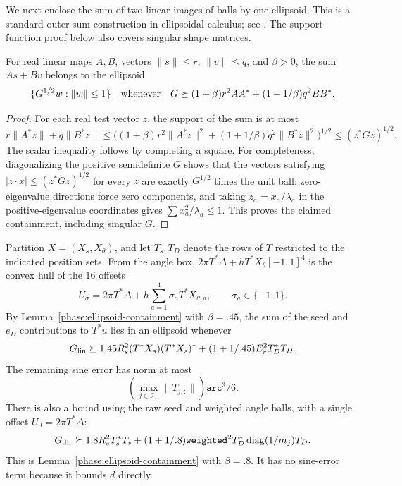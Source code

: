 We next enclose the sum of two linear images of balls by one ellipsoid.
This is a standard outer-sum construction in ellipsoidal calculus; see
\cite[Section~2.2.2, equation~(2.16)]{KurzhanskiyVaraiya2006EllipsoidalToolbox}.
The support-function proof below also covers singular shape matrices.

\begin{lemma}
\label{phase:ellipsoid-containment}
For real linear maps \(A,B\), vectors \(\|s\|\leq r\),
\(\|v\|\leq q\), and \(\beta>0\), the sum \(As+Bv\) belongs to
the ellipsoid
\[
 \{G^{1/2}w:\|w\|\leq1\}
 \quad\hbox{whenever}\quad
 G\succeq(1+\beta)r^2AA^*+(1+1/\beta)q^2BB^*.
\]
\end{lemma}

\begin{proof}
For each real test vector \(z\), the support of the sum is at most
\[
 r\|A^*z\|+q\|B^*z\|
 \leq\bigl((1+\beta)r^2\|A^*z\|^2+
                 (1+1/\beta)q^2\|B^*z\|^2\bigr)^{1/2}
 \leq(z^*Gz)^{1/2}.
\]
The scalar inequality follows by completing a square.
For completeness, diagonalizing the positive semidefinite \(G\)
shows that the vectors satisfying
\(|z\cdot x|\leq(z^*Gz)^{1/2}\) for every \(z\) are exactly
\(G^{1/2}\) times the unit ball: zero-eigenvalue directions force
zero components, and taking
\(z_a=x_a/\lambda_a\) in the positive-eigenvalue coordinates gives
\(\sum x_a^2/\lambda_a\leq1\).
This proves the claimed containment, including singular \(G\).
\end{proof}

Partition \(X=(X_s,X_\theta)\), and let \(T_s,T_D\) denote the rows
of \(T\) restricted to the indicated position sets.  From the angle
box, \(2\pi T^*\Delta+hT^*X_\theta[-1,1]^4\) is the convex hull of
the \(16\) offsets
\begin{equation}
 U_\sigma=2\pi T^*\Delta+
                h\sum_{a=1}^{4}\sigma_a T^*X_{\theta,a},
 \qquad \sigma_a\in\{-1,1\}.
 \label{phase:offset-corners}
\end{equation}
By Lemma~\ref{phase:ellipsoid-containment} with \(\beta=.45\), the
sum of the seed and \(e_D\) contributions to \(T^*u\) lies in an
ellipsoid whenever
\begin{equation}
 G_{\rm lin}\succeq
    1.45R_s^2(T^*X_s)(T^*X_s)^*
       +(1+1/.45)E_r^2T_D^*T_D.
 \label{phase:ellipsoid-linear}
\end{equation}
The remaining sine error has norm at most
\[
 \left(\max_{j\in\mathcal I_D}\|T_{j,:}\|\right)
                               \mathtt{arc}^3/6.
\]
There is also a bound using the raw seed and weighted angle balls,
with a single offset \(U_0=2\pi T^*\Delta\):
\begin{equation}
 G_{\rm dir}\succeq
    1.8R_s^2T_s^*T_s+
       (1+1/.8)\mathtt{weighted}^2
                     T_D^*\operatorname{diag}(1/m_j)T_D.
 \label{phase:ellipsoid-direct}
\end{equation}
This is Lemma~\ref{phase:ellipsoid-containment} with \(\beta=.8\).
It has no sine-error term because it bounds \(d\) directly.

